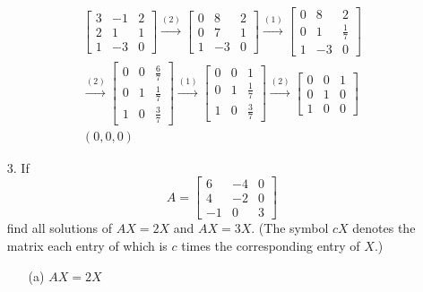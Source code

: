 \documentclass{article}
\begin{document}
\begin{enumerate}[listparindent=\parindent]
\begin{gather*}
    \begin{bmatrix}
        3 & -1 & 2 \\
        2 & 1 & 1 \\
        1 & -3 & 0
    \end{bmatrix}
    \xrightarrow{(2)}
    \begin{bmatrix}
        0 & 8 & 2 \\
        0 & 7 & 1 \\
        1 & -3 & 0
    \end{bmatrix}
    \xrightarrow{(1)}
    \begin{bmatrix}
        0 & 8 & 2 \\
        0 & 1 & \frac{1}{7} \\
        1 & -3 & 0
    \end{bmatrix}
    \\
    \xrightarrow{(2)}
    \begin{bmatrix}
        0 & 0 & \frac{6}{7} \\
        0 & 1 & \frac{1}{7} \\
        1 & 0 & \frac{3}{7}
    \end{bmatrix}
    \xrightarrow{(1)}
    \begin{bmatrix}
        0 & 0 & 1 \\
        0 & 1 & \frac{1}{7} \\
        1 & 0 & \frac{3}{7}
    \end{bmatrix}
    \xrightarrow{(2)}
    \begin{bmatrix}
        0 & 0 & 1 \\
        0 & 1 & 0 \\
        1 & 0 & 0
    \end{bmatrix} \\
    \boxed{ (0, 0, 0) }
\end{gather*}

\item[3.] If
    \[
        A = \begin{bmatrix}
            6 & -4 & 0 \\
            4 & -2 & 0 \\
            -1 & 0 & 3
        \end{bmatrix}
    \]
    find all solutions of \(AX = 2X\) and \(AX = 3X\).
    (The symbol \(cX\) denotes the matrix each entry of which is \(c\) times the corresponding entry of \(X\).)

\begin{enumerate}
\item[(a)] \(AX = 2X\)


\end{enumerate}
\end{enumerate}
\end{document}
